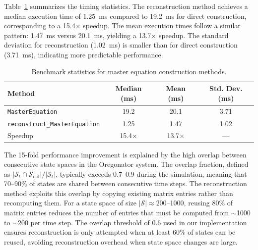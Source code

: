 \documentclass[final,supplement,onefignum,onetabnum]{siamart171218}
\begin{document}
Table~\ref{tab:benchmark} summarizes the timing statistics. The reconstruction method achieves a median execution time of 1.25~ms compared to 19.2~ms for direct construction, corresponding to a 15.4$\times$ speedup. The mean execution times follow a similar pattern: 1.47~ms versus 20.1~ms, yielding a 13.7$\times$ speedup. The standard deviation for reconstruction (1.02~ms) is smaller than for direct construction (3.71~ms), indicating more predictable performance.

\begin{table}[h]
\centering
\caption{Benchmark statistics for master equation construction methods.}
\label{tab:benchmark}
\begin{tabular}{lccc}
\hline
Method & Median (ms) & Mean (ms) & Std. Dev. (ms) \\
\hline
\texttt{MasterEquation} & 19.2 & 20.1 & 3.71 \\
\texttt{reconstruct\_MasterEquation} & 1.25 & 1.47 & 1.02 \\
\hline
Speedup & 15.4$\times$ & 13.7$\times$ & --- \\
\hline
\end{tabular}
\end{table}

The 15-fold performance improvement is explained by the high overlap between consecutive state spaces in the Oregonator system. The overlap fraction, defined as $|\mathcal{S}_t \cap \mathcal{S}_{\text{old}}| / |\mathcal{S}_t|$, typically exceeds 0.7--0.9 during the simulation, meaning that 70--90\% of states are shared between consecutive time steps. The reconstruction method exploits this overlap by copying existing matrix entries rather than recomputing them. For a state space of size $|\mathcal{S}| \approx 200$--1000, reusing 80\% of matrix entries reduces the number of entries that must be computed from $\sim$1000 to $\sim$200 per time step. The overlap threshold of 0.6 used in our implementation ensures reconstruction is only attempted when at least 60\% of states can be reused, avoiding reconstruction overhead when state space changes are large.
\end{document}
